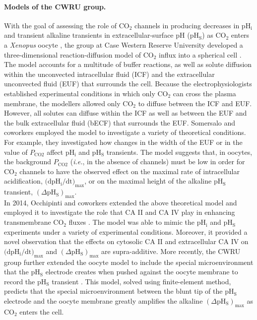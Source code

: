 \documentclass[fleqn,10pt]{physiome}
\begin{document}
\paragraph{Models of the CWRU group.} With the goal of assessing the role of $\mathrm{CO_2}$ channels in producing decreases in $\mathrm{pH_i}$ and transient alkaline transients in extracellular-surface $\mathrm{pH}$ ($\mathrm{pH_S}$) as $\mathrm{CO_2}$ enters a \emph{Xenopus} oocyte \citep{endeward2006evidence,musa2009relative,musa2010using}, the group at Case Western Reserve University developed a three-dimensional reaction-diffusion model of $\mathrm{CO_2}$ influx into a spherical cell \citep{somersalo2012reaction}. The model accounts for a multitude of buffer reactions, as well as solute diffusion within the unconvected intracellular fluid (ICF) and the extracellular unconvected fluid (EUF) that surrounds the cell. Because the electrophysiologists established experimental conditions in which only $\mathrm{CO_2}$ can cross the plasma membrane, the modellers allowed only $\mathrm{CO_2}$ to diffuse between the ICF and EUF. However, all solutes can diffuse within the ICF as well as between the EUF and the bulk extracellular fluid (bECF) that surrounds the EUF. Somersalo and coworkers employed the model to investigate a variety of theoretical conditions. For example, they investigated how changes in the width of the EUF or in the value of $P_\mathrm{CO2}$ affect $\mathrm{pH_i}$ and $\mathrm{pH_S}$ transients. The model suggests that, in oocytes, the background $P_\mathrm{CO2}$ (\emph{i.e.}, in the absence of channels) must be low in order for $\mathrm{CO_2}$ channels to have the observed effect on the maximal rate of intracellular acidification, $(\mathrm{dpH_i/dt)_{max}}$, or on the maximal height of the alkaline $\mathrm{pH_S}$ transient, $(\Delta\mathrm{pH_S})_\mathrm{max}$.\\

In 2014, Occhipinti and coworkers extended the above theoretical model and employed it to investigate the role that CA II and CA IV play in enhancing transmembrane $\mathrm{CO_2}$ fluxes \citep{musa2014evidenceII,musa2014evidenceIV,occhipinti2014evidence}. The model was able to mimic the $\mathrm{pH_i}$ and $\mathrm{pH_S}$ experiments under a variety of experimental conditions. Moreover, it provided a novel observation that the effects on cytosolic CA II and extracellular CA IV on $(\mathrm{dpH_i/dt)_{max}}$ and $(\Delta\mathrm{pH_S})_\mathrm{max}$ are supra-additive. More recently, the CWRU group further extended the oocyte model to include the special microenvironment that the $\mathrm{pH_S}$ electrode creates when pushed against the oocyte membrane to record the $\mathrm{pH_S}$ transient \citep{calvetti2020}. This model, solved using finite-element method, predicts that the special microenvironment between the blunt tip of the $\mathrm{pH_S}$ electrode and the oocyte membrane greatly amplifies the alkaline $(\Delta\mathrm{pH_S})_\mathrm{max}$ as $\mathrm{CO_2}$ enters the cell.
\end{document}
